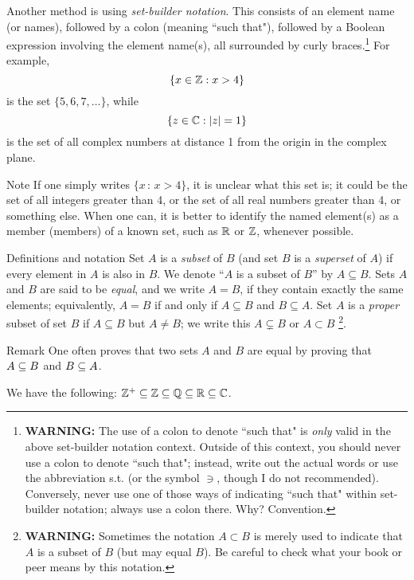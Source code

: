  Another method is using \textit{set-builder notation}. This consists of an element name (or
names), followed by a colon (meaning ``such that"), followed by
a Boolean expression involving the element name(s), all
surrounded by curly braces.\footnote{
 \textbf{WARNING:} The use of a colon to denote ``such that" is \textit{only} valid in the above set-builder notation context.  Outside of this context, you should never use a colon to denote ``such that"; instead, write out the actual words or use the abbreviation s.t. (or the symbol $\ni$, though I do not recommended).  Conversely, never use one of those ways of indicating ``such that" within set-builder notation; always use a colon there.  Why?  Convention.}
 For example,
$$\{x\in \mathbb{Z} : x > 4\}$$ is the set $\{5, 6, 7, \ldots\}$, while
$$\{z\in \mathbb{C} : |z|=1\}$$ is the set of all complex numbers at
distance 1 from the origin in the complex plane.

\begin{df}{Note} If one simply writes $\{x\,:\,x>4\}$,
it is unclear what this set is; it could be the set of all
integers greater than 4, or the set of all real numbers greater
than 4, or something else. When one can, it is better to
identify the named element(s) as a member (members) of a known
set, such as $\mathbb{R}$ or $\mathbb{Z}$, whenever possible.\end{df}

\begin{df}{Definitions and notation} Set $A$ is a \textit{subset} of $B$ (and set $B$ is a \textit{superset} of $A$) if every element in $A$ is also in $B$. We
denote ``$A$ is a subset of $B$'' by $A\subseteq B$. Sets $A$
and $B$ are said to be \textit{equal}, and we write $A=B$, if they
contain exactly the same elements; equivalently, $A=B$ if and
only if $A \subseteq B$ and $B\subseteq A$.  Set $A$ is a \textit{proper} subset of set $B$ if $A\subseteq B$ but $A\neq B$; we
write this $A\subsetneq B$ or $A\subset B$ \footnote{ \textbf{
WARNING:} Sometimes the notation $A\subset B$ is merely used to
indicate that $A$ is a subset of $B$ (but may equal $B$). Be
careful to check what your book or peer means by this
notation.}. \end{df}

\begin{df}{Remark} One often proves that two sets $A$ and
$B$ are equal by proving that $A\subseteq B$ and $B\subseteq A$.\end{df}

\begin{example}{} We have the following: $\mathbb{Z}^+ \subseteq \mathbb{Z} \subseteq \mathbb{Q} \subseteq \mathbb{R} \subseteq \mathbb{C}$. \end{example}


